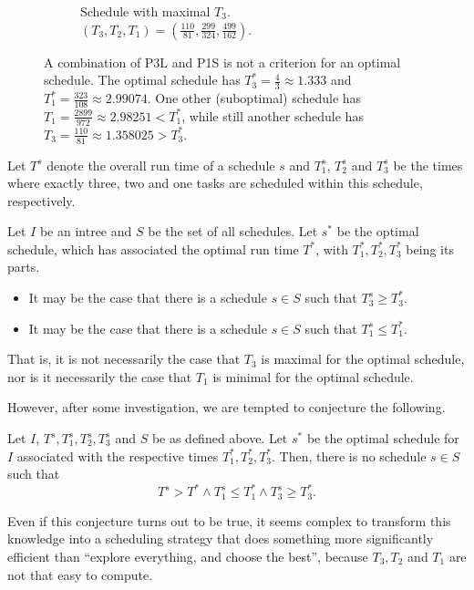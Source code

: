 \begin{figure}[ht]
\begin{subfigure}{.3\linewidth}
    \caption{Schedule with maximal $T_3$. $(T_3,T_2,T_1)=(\frac{110}{81},\frac{299}{324},\frac{499}{162})$.}
  \end{subfigure}
  \caption{A combination of P3L and P1S is not a criterion for an optimal schedule. The optimal schedule has $T_3^*=\frac{4}{3}\approx 1.333$ and $T_1^*=\frac{323}{108}\approx 2.99074$. One other (suboptimal) schedule has $T_1=\frac{2899}{972}\approx 2.98251 < T_1^*$, while still another schedule has $T_3=\frac{110}{81}\approx1.358025 > T_3^*$.}
  \label{fig:p3l-p1s-combo-suboptimal}
\end{figure}

\begin{corollary}
  Let $T^s$ denote the overall run time of a schedule $s$ and $T_1^s$, $T_2^s$ and $T_3^s$ be the times where exactly three, two and one tasks are scheduled within this schedule, respectively.

  Let $I$ be an intree and $S$ be the set of all schedules. Let $s^*$ be the optimal schedule, which has associated the optimal run time $T^*$, with $T_1^*, T_2^*, T_3^*$ being its parts.
  \begin{itemize}
  \item It may be the case that there is a schedule $s\in S$ such that $T_3^s \geq T_3^*$.
  \item It may be the case that there is a schedule $s\in S$ such that $T_1^s \leq T_1^*$.
  \end{itemize}
\end{corollary}

That is, it is not necessarily the case that $T_3$ is maximal for the optimal schedule, nor is it necessarily the case that $T_1$ is minimal for the optimal schedule.

However, after some investigation, we are tempted to conjecture the following.

\begin{conjecture}
  Let $I$, $T^s, T_1^s, T_2^s, T_3^s$ and $S$ be as defined above. Let $s^*$ be the optimal schedule for $I$ associated with the respective times $T_1^*, T_2^*, T_3^*$. Then, there is no schedule $s\in S$ such that
  \begin{equation*}
    T^s > T^* \wedge T_1^s \leq T_1^* \wedge T_3^s \geq T_3^*.
  \end{equation*}
\end{conjecture}

Even if this conjecture turns out to be true, it seems complex to transform this knowledge into a scheduling strategy that does something more significantly efficient than ``explore everything, and choose the best'', because $T_3, T_2$ and $T_1$ are not that easy to compute.


